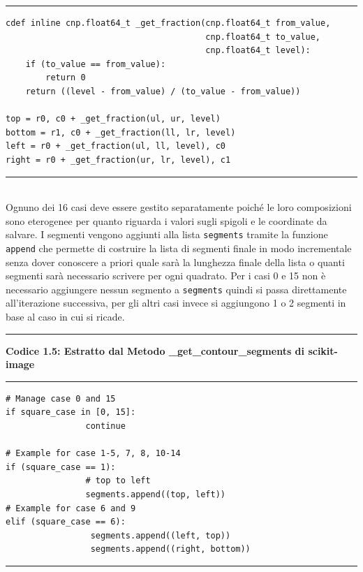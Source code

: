 \documentclass[12pt,a4paper]{report}
\begin{document}
\noindent\rule[0.5ex]{\linewidth}{1pt}
\begin{lstlisting}
cdef inline cnp.float64_t _get_fraction(cnp.float64_t from_value,
                                        cnp.float64_t to_value,
                                        cnp.float64_t level):
    if (to_value == from_value):
        return 0
    return ((level - from_value) / (to_value - from_value))

top = r0, c0 + _get_fraction(ul, ur, level)
bottom = r1, c0 + _get_fraction(ll, lr, level)
left = r0 + _get_fraction(ul, ll, level), c0
right = r0 + _get_fraction(ur, lr, level), c1
\end{lstlisting}
\noindent\rule[0.5ex]{\linewidth}{1pt} \\[10pt]
Ognuno dei 16 casi deve essere gestito separatamente poiché le loro composizioni sono eterogenee per quanto riguarda i valori sugli spigoli e le coordinate da salvare.  
I segmenti vengono aggiunti alla lista \verb|segments| tramite la funzione  \verb|append| che permette di costruire la lista di segmenti finale in modo incrementale senza dover conoscere a priori quale sarà la lunghezza finale della lista o quanti segmenti sarà necessario scrivere per ogni quadrato.  Per i casi 0 e 15 non è necessario aggiungere nessun segmento a \verb|segments| quindi si passa direttamente all'iterazione successiva, per gli altri casi invece si aggiungono 1 o 2 segmenti in base al caso in cui si ricade.\\[10pt]
\noindent\rule[0.5ex]{\linewidth}{2pt}
\small{\textbf{Codice 1.5: Estratto dal Metodo \_get\_contour\_segments di scikit-image}} \\
\noindent\rule[0.5ex]{\linewidth}{1pt}
\begin{lstlisting}
# Manage case 0 and 15
if square_case in [0, 15]:
                continue

# Example for case 1-5, 7, 8, 10-14
if (square_case == 1): 
                # top to left
                segments.append((top, left))
# Example for case 6 and 9
elif (square_case == 6):
                 segments.append((left, top))
                 segments.append((right, bottom))
\end{lstlisting}
\noindent\rule[0.5ex]{\linewidth}{1pt} \newpage

\end{document}
